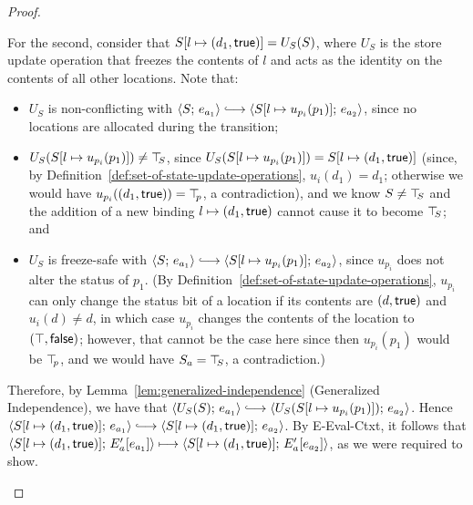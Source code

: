 \begin{proof}
\begin{enumerate}
\begin{enumerate}
\begin{itemize}
\begin{itemize}
              For the second, consider that
              $S[l \mapsto (d_1, \textsf{true})] = U_S(S)$, where $U_S$ is
              the store update operation that freezes the contents of $l$
              and acts as the identity on the contents of all other
              locations.  Note that:
              \begin{itemize}
              \item $U_S$ is non-conflicting with $\config{S}{e_{a_1}}
                \parstepsto
                \config{\extSRaw{S}{l}{u_{p_i}(p_1)}}{e_{a_2}}$, since no
                locations are allocated during the transition;
              \item $U_S(S[l \mapsto u_{p_i}(p_1)]) \neq \top\hspace{-0.85mm}_{S}$,
                since $U_S(S[l \mapsto u_{p_i}(p_1)]) =
                S[l \mapsto (d_1, \textsf{true})]$ (since, by
                Definition~\ref{def:set-of-state-update-operations},
                $u_i(d_1) = d_1$; otherwise we would have
                $u_{p_i}((d_1, \textsf{true})) = \top\hspace{-0.85mm}_{p}$, a
                contradiction), and we know $S \neq \top\hspace{-0.85mm}_{S}$ and the
                addition of a new binding
                $l \mapsto (d_1, \textsf{true})$ cannot cause it
                to become $\top\hspace{-0.85mm}_{S}$; and
              \item $U_S$ is freeze-safe with $\config{S}{e_{a_1}}
                \parstepsto
                \config{\extSRaw{S}{l}{u_{p_i}(p_1)}}{e_{a_2}}$, since
                $u_{p_i}$ does not alter the status of $p_1$.  (By
                Definition~\ref{def:set-of-state-update-operations},
                $u_{p_i}$ can only change the status bit of a location
                if its contents are $(d, \textsf{true})$ and
                $u_i(d) \neq d$, in which case $u_{p_i}$ changes the
                contents of the location to
                $(\top, \textsf{false})$; however, that cannot be
                the case here since then $u_{p_i}(p_1)$ would be
                $\top\hspace{-0.85mm}_{p}$, and we would have $S_a = \top\hspace{-0.85mm}_{S}$, a
                contradiction.)
              \end{itemize}
              Therefore, by Lemma~\ref{lem:generalized-independence}
              (Generalized Independence), we have that
              $\config{U_S(S)}{e_{a_1}} \parstepsto
              \config{U_S(\extSRaw{S}{l}{u_{p_i}(p_1)})}{e_{a_2}}$.
              Hence $\config{\extS{S}{l}{d_1}{\frozentrue}}{e_{a_1}}
              \parstepsto
              \config{\extS{S}{l}{d_1}{\frozentrue}}{e_{a_2}}$.
              By {\sc E-Eval-Ctxt}, it follows that
              $\langle S[l \mapsto (d_1, \textsf{true})];\, E'_a\hspace{-0.5mm}\left[e_{a_1}\right] \rangle
              \longmapsto
              \langle S[l \mapsto (d_1, \textsf{true})];\, E'_a\hspace{-0.5mm}\left[e_{a_2}\right] \rangle$,
              as we were required to show.
          \end{itemize}


\end{itemize}
\end{enumerate}
\end{enumerate}
\end{proof}
